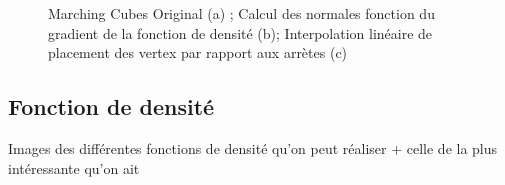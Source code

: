 \documentclass[a4paper]{article}
\begin{document}
\begin{figure}[H]
\centering
{}
\caption{Marching Cubes Original (a) ; Calcul des normales fonction du gradient de la fonction de densité (b); Interpolation linéaire de placement des vertex par rapport aux arrètes (c)}
\end{figure}


\subsection{Fonction de densité}

Images des différentes fonctions de densité qu'on peut réaliser + celle de la plus intéressante qu'on ait 
\end{document}
